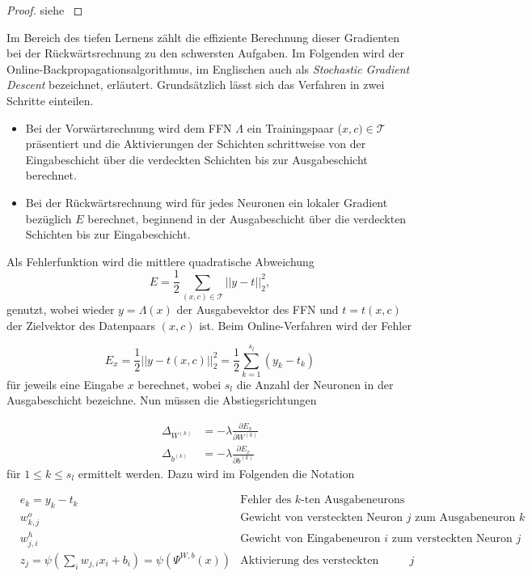 \begin{proof}
    siehe \cite{forster2017analysis}
\end{proof}
Im Bereich des tiefen Lernens zählt die effiziente Berechnung dieser Gradienten bei der Rückwärtsrechnung zu den schwersten Aufgaben\cite{DBLP:series/lncs/LeCunBOM12}.
Im Folgenden wird der Online-Backpropagationsalgorithmus, im Englischen auch als \textit{Stochastic Gradient Descent} bezeichnet, erläutert. Grundsätzlich lässt sich das Verfahren in zwei Schritte einteilen.

\begin{itemize}
    \item Bei der Vorwärtsrechnung wird dem FFN $\Lambda$ ein Trainingspaar ($x,c) \in \mathcal{T}$ präsentiert und die Aktivierungen der Schichten schrittweise von der Eingabeschicht über die verdeckten Schichten bis zur Ausgabeschicht berechnet.
    \item Bei der Rückwärtsrechnung wird für jedes Neuronen ein lokaler Gradient bezüglich $E$ berechnet, beginnend in der Ausgabeschicht über die verdeckten Schichten bis zur Eingabeschicht.
\end{itemize}
Als Fehlerfunktion wird die mittlere quadratische Abweichung 
\begin{equation}
    \label{eq:MSE}
    E=\frac{1}{2} \sum_{(x,c) \in \mathcal{T}} ||y-t||_2^2,
\end{equation}
genutzt, wobei wieder $y=\Lambda(x)$ der Ausgabevektor des FFN und $t=t(x,c)$ der Zielvektor des Datenpaars $(x,c)$ ist. Beim Online-Verfahren wird der Fehler 

\begin{equation}
    \label{eq:MSE_single}
    E_x= \frac{1}{2} ||y-t(x,c)||_2^2= \frac{1}{2} \sum_{k=1}^{s_l} (y_k-t_k)
\end{equation}
für jeweils eine Eingabe $x$ berechnet, wobei $s_l$ die Anzahl der Neuronen in der Ausgabeschicht bezeichne. Nun müssen die Abstiegsrichtungen 

\begin{align*}
    \Delta_{W^{(k)}} &= -\lambda \frac{\partial E_x}{\partial W^{(k)}} \\
    \Delta_{b^{(k)}} &= -\lambda \frac{\partial E_x}{\partial b^{(k)}} 
\end{align*}
für $1 \leq k \leq s_l$ ermittelt werden. Dazu wird im Folgenden die Notation

\begin{align*}
    &e_k=y_k-t_k& \text{Fehler des $k$-ten Ausgabeneurons}  \\
    &w_{k,j}^o&   \text{Gewicht von versteckten Neuron $j$ zum Ausgabeneuron $k$} \\
    &w_{j,i}^h&   \text{Gewicht von Eingabeneuron $i$ zum versteckten Neuron $j$} \\
    &z_{j}= \psi \left(\sum_{i} w_{j,i} x_i+b_i\right)= \psi\left(\Psi^{W,b}(x)\right)& \text{Aktivierung des versteckten Neurons $j$}
\end{align*}




